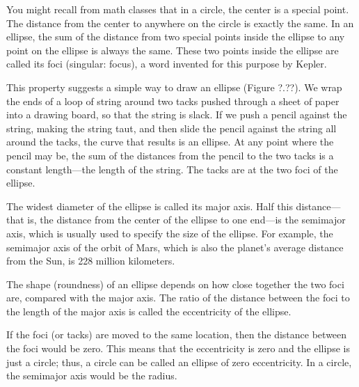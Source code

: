 \documentclass[../../main-astronomy.tex]{subfiles}
\begin{document}
\vspace{1em} %

You might recall from math classes that in a circle, the center is a special point. The distance from the center to anywhere on the circle is exactly the same. In an ellipse, the sum of the distance from two special points inside the ellipse to any point on the ellipse is always the same. These two points inside the ellipse are called its foci (singular: focus), a word invented for this purpose by Kepler.

\vspace{1em}

This property suggests a simple way to draw an ellipse (Figure ?.??). We wrap the ends of a loop of string around two tacks pushed through a sheet of paper into a drawing board, so that the string is slack. If we push a pencil against the string, making the string taut, and then slide the pencil against the string all around the tacks, the curve that results is an ellipse. At any point where the pencil may be, the sum of the distances from the pencil to the two tacks is a constant length---the length of the string. The tacks are at the two foci of the ellipse.

\vspace{1em}

The widest diameter of the ellipse is called its major axis. Half this distance---that is, the distance from the center of the ellipse to one end---is the semimajor axis, which is usually used to specify the size of the ellipse. For example, the semimajor axis of the orbit of Mars, which is also the planet's average distance from the Sun, is 228 million kilometers.

\vspace{1em}

The shape (roundness) of an ellipse depends on how close together the two foci are, compared with the major axis. The ratio of the distance between the foci to the length of the major axis is called the eccentricity of the ellipse.

\vspace{1em}

If the foci (or tacks) are moved to the same location, then the distance between the foci would be zero. This means that the eccentricity is zero and the ellipse is just a circle; thus, a circle can be called an ellipse of zero eccentricity. In a circle, the semimajor axis would be the radius.

\vspace{1em}
\end{document}
